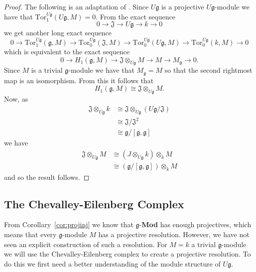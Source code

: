 \begin{proof}
  The following is an adaptation of \cite[Corollary 7.3.6]{weibel1994homological}.
  Since $ U\mathfrak{g} $ is a projective $ U\mathfrak{g} $-module we have that $ \text{Tor}_1^{U\mathfrak{g}}(U\mathfrak{g}, M) = 0 $. From the exact sequence
  \begin{equation}
    0 \to \mathfrak{J} \to U\mathfrak{g} \to k \to 0
  \end{equation}
  we get another long exact sequence
  \begin{equation}
    0 \to \text{Tor}_1^{U\mathfrak{g}}(\mathfrak{g}, M) \to \text{Tor}_0^{U\mathfrak{g}}(\mathfrak{J}, M) \to \text{Tor}_0^{U\mathfrak{g}}(U\mathfrak{g}, M) \to \text{Tor}_0^{U\mathfrak{g}}(k, M) \to 0
  \end{equation}
  which is equivalent to the exact sequence
  \begin{equation}
    0 \to H_1(\mathfrak{g}, M) \to \mathfrak{J} \otimes_{U\mathfrak{g}} M \to M \to M_{\mathfrak{g}} \to 0.
  \end{equation}
  Since $ M $ is a trivial $ \mathfrak{g} $-module we have that $ M_\mathfrak{g} = M $ so that the second rightmost map is an isomorphism. From this it follows that
  \begin{equation}
    H_1(\mathfrak{g}, M) \cong \mathfrak{J} \otimes_{U\mathfrak{g}} M.
  \end{equation}
  Now, as
  \begin{align*}
    \mathfrak{J} \otimes_{U\mathfrak{g}} k &\cong \mathfrak{J} \otimes_{U\mathfrak{g}} (U\mathfrak{g}/\mathfrak{J}) \\
                                           &\cong \mathfrak{J}/\mathfrak{J}^2 \\
                                           &\cong \mathfrak{g}/[\mathfrak{g}, \mathfrak{g}]
  \end{align*}
  we have
  \begin{align*}
    \mathfrak{J} \otimes_{U\mathfrak{g}} M &\cong (J \otimes_{U\mathfrak{g}} k) \otimes_k M \\
                                           &\cong (\mathfrak{g}/[\mathfrak{g}, \mathfrak{g}]) \otimes_k M
  \end{align*}
  and so the result follows.
\end{proof}

\subsection{The Chevalley-Eilenberg Complex} %
\label{sec:The Chevalley-Eilenberg Complex}
From Corollary~\ref{cor:projinj} we know that $ \mathfrak{g} $-\textbf{Mod} has enough projectives, which means that every $ \mathfrak{g} $-module $ M $ has a projective resolution. However, we have not seen an explicit construction of such a resolution. For $ M=k $ a trivial $ \mathfrak{g} $-module we will use the Chevalley-Eilenberg complex to create a projective resolution. To do this we first need a better understanding of the module structure of $ U\mathfrak{g} $.

